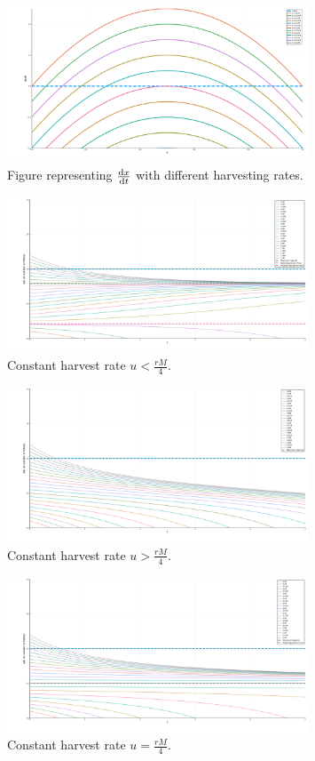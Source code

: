 \begin{figure}[H]
	\centering
	\includegraphics[width=0.8\textwidth]{CriticalPoints.png}
	\caption{Figure representing $\frac{\mathrm{d} x}{{\mathrm{d} t}}$ with different harvesting rates.}
	\label{fig: CriticalPoints}
\end{figure}
\begin{figure}
		\centering
		\includegraphics[width=0.8\textwidth]{SustainableConstant.png}
		\caption{Constant harvest rate $u<\frac{rM}{4}$.}
		\label{fig: SustainableConstantHarvest}
\end{figure}
\begin{figure}
	\centering
	\includegraphics[width=0.8\textwidth]{OverExploitConstant.png}
	\caption{Constant harvest rate $u>\frac{rM}{4}$.}
	\label{fig: OverExploitConstantHarvest}
\end{figure}

\begin{figure}
	\centering
	\includegraphics[width=0.8\textwidth]{CriticalExploitConstant.png}
	\caption{Constant harvest rate $u=\frac{rM}{4}$.}
	\label{fig: CriticalExploitConstantHarvest}
\end{figure}

